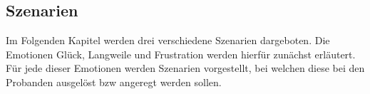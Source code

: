 \subsection{Szenarien} \label{szenarien-1}


Im Folgenden Kapitel werden drei verschiedene Szenarien dargeboten. Die Emotionen Gl{\"u}ck, Langweile und Frustration werden hierf{\"u}r zun{\"a}chst erl{\"a}utert. F{\"u}r jede dieser Emotionen werden Szenarien vorgestellt, bei welchen diese bei den Probanden ausgel{\"o}st bzw angeregt werden sollen.






